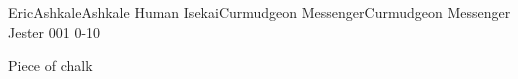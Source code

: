 
\filledCS%
  {\ifnum{}\ifnum{} Eric\else Ashkale\fi\else Ashkale\fi}%
  {Human}%
  {\ifnum{}\ifnum{} Isekai\else Curmudgeon Messenger\fi\else Curmudgeon Messenger\fi}%
  {Jester}%
  {{0}{0}{1}}%
  {{0}{-1}{0}}%
  {%
    \setcounter{Athletics}{2}
    \setcounter{Stealth}{1}
    \setcounter{Cultivation}{1}

    \setcounter{Melee}{1}
    \setcounter{equipmentWeight}{0}
  }%
  {\charge}%
  {Piece of chalk}%

